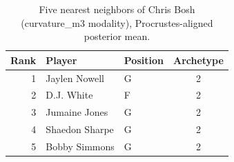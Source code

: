 \begin{table}[htbp]
  \centering\small
  \begin{tabular}{rllc}
    \toprule
    Rank & Player & Position & Archetype \\
    \midrule
    1 & Jaylen Nowell & G & 2 \\
    2 & D.J. White & F & 2 \\
    3 & Jumaine Jones & G & 2 \\
    4 & Shaedon Sharpe & G & 2 \\
    5 & Bobby Simmons & G & 2 \\
    \bottomrule
  \end{tabular}
  \caption{Five nearest neighbors of Chris Bosh (curvature_m3 modality), Procrustes-aligned posterior mean.}
  \label{tab:Chris_Bosh_neighbors_curvature_m3}
\end{table}


